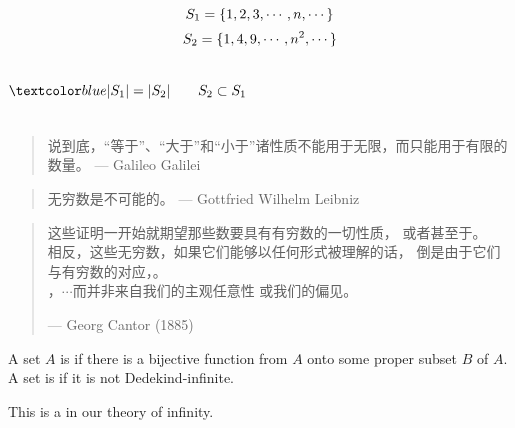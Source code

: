 \begin{frame}{}
  \[
    S_1 = \{1, 2, 3, \cdots, n, \cdots\}
  \]
  \[
    S_2 = \{1, 4, 9, \cdots, n^2, \cdots\}
  \]

  \begin{columns}
      \pause
      \[
	\blue{|S_1| = |S_2| \qquad S_2 \subset S_1}
      \]

      \pause
      \begin{center}
	{}
      \end{center}
      \pause
  \end{columns}

  \pause
  \vspace{0.80cm}
  \begin{quote}
    说到底，``等于''、``大于''和``小于''诸性质不能用于无限，而只能用于有限的数量。 \hfill --- Galileo Galilei
  \end{quote}

  \pause
  \vspace{0.20cm}
  \begin{quote}
    无穷数是不可能的。 \hfill --- Gottfried Wilhelm Leibniz
  \end{quote}
\end{frame}

\begin{frame}{}
  \begin{quote}
    这些证明一开始就期望那些数要具有有穷数的一切性质，
    或者甚至于。\\[15pt]

    相反，这些无穷数，如果它们能够以任何形式被理解的话，
    倒是由于它们与有穷数的对应，。\\[15pt]

    ，$\cdots$而并非来自我们的主观任意性
    或我们的偏见。

    \hfill --- Georg Cantor (1885)
  \end{quote}
\end{frame}

\begin{frame}{}
  \begin{definition}
    A set $A$ is  
    if there is a bijective function from $A$ onto some proper subset $B$ of $A$. \\[8pt]
    
    A set is  if it is not Dedekind-infinite.
  \end{definition}

  \pause

  \begin{center}
    This is a  in our theory of infinity.
  \end{center}
\end{frame}

\begin{frame}{}

  \begin{center}
  \end{center}
\end{frame}
